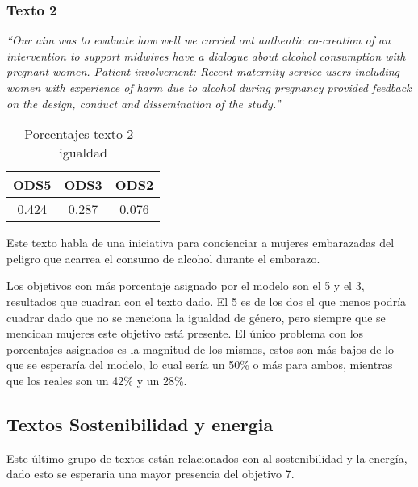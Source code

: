 \subsubsection{Texto 2}
\begin{center}
    \textit{``Our aim was to evaluate how well we carried out authentic
    co-creation of an intervention to support midwives have a dialogue about
    alcohol consumption with pregnant women. Patient involvement: Recent
    maternity service users including women with experience of harm due to
    alcohol during pregnancy provided feedback on the design, conduct and
    dissemination of the study.''}\cite{validationtexts7}
    \begin{table}[H]
        \begin{tabular}{c | c | c }
            \hline
            ODS5 & ODS3 & ODS2\\ \hline
            0.424 & 0.287 & 0.076 \\ \hline
        \end{tabular}
        \caption{Porcentajes texto 2 - igualdad}
\end{table}
\end{center}

Este texto habla de una iniciativa para concienciar a mujeres embarazadas del
peligro que acarrea el consumo de alcohol durante el embarazo. 

Los objetivos con más porcentaje asignado por el modelo son el 5 y el 3,
resultados que cuadran con el texto dado. El 5 es de los dos el que menos podría
cuadrar dado que no se menciona la igualdad de género, pero siempre que se
mencioan mujeres este objetivo está presente. El único problema con los
porcentajes asignados es la magnitud de los mismos, estos son más bajos de lo
que se esperaría del modelo, lo cual sería un 50\% o más para ambos, mientras
que los reales son un 42\% y un 28\%.

\subsection{Textos Sostenibilidad y energia}
Este último grupo de textos están relacionados con al sostenibilidad y la
energía, dado esto se esperaria una mayor presencia del objetivo 7.


